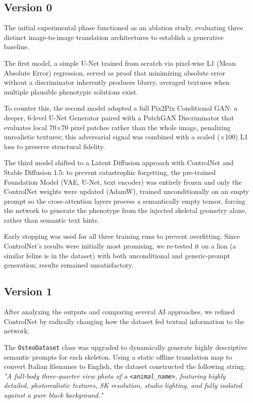 \documentclass{article}
\begin{document}
\subsection{Version 0}
The initial experimental phase functioned as an ablation study, evaluating three distinct image-to-image translation architectures to establish a generative baseline.

The first model, a simple U-Net trained from scratch via pixel-wise L1 (Mean Absolute Error) regression, served as proof that minimizing absolute error without a discriminator inherently produces blurry, averaged textures when multiple plausible phenotypic solutions exist.

To counter this, the second model adopted a full Pix2Pix Conditional GAN: a deeper, 6-level U-Net Generator paired with a PatchGAN Discriminator that evaluates local 70$\times$70 pixel patches rather than the whole image, penalizing unrealistic textures; this adversarial signal was combined with a scaled ($\times$100) L1 loss to preserve structural fidelity.

The third model shifted to a Latent Diffusion approach with ControlNet and Stable Diffusion 1.5: to prevent catastrophic forgetting, the pre-trained Foundation Model (VAE, U-Net, text encoder) was entirely frozen and only the ControlNet weights were updated (AdamW), trained unconditionally on an empty prompt so the cross-attention layers process a semantically empty tensor, forcing the network to generate the phenotype from the injected skeletal geometry alone, rather than semantic text hints.

Early stopping was used for all three training runs to prevent overfitting. Since ControlNet's results were initially most promising, we re-tested it on a lion (a similar feline is in the dataset) with both unconditional and generic-prompt generation; results remained unsatisfactory.

\subsection{Version 1}
After analyzing the outputs and comparing several AI approaches, we refined ControlNet by radically changing how the dataset fed textual information to the network.

The \texttt{OsteoDataset} class was upgraded to dynamically generate highly descriptive semantic prompts for each skeleton. Using a static offline translation map to convert Italian filenames to English, the dataset constructed the following string: \textit{"A full-body three-quarter view photo of a \texttt{<animal\_name>}, featuring highly detailed, photorealistic textures, 8K resolution, studio lighting, and fully isolated against a pure black background."}
\end{document}
